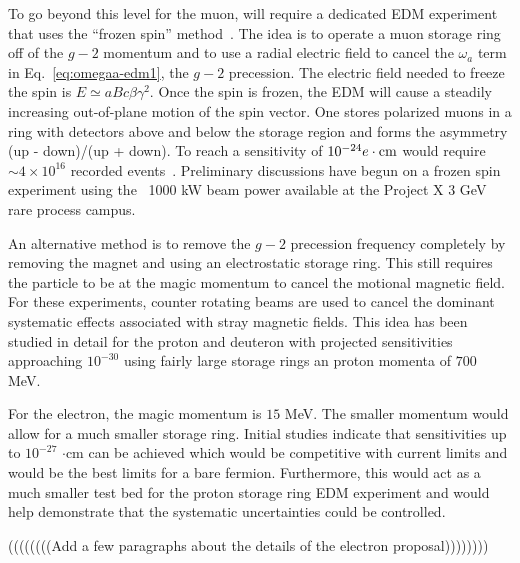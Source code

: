 To go beyond this level for the muon, will require a dedicated EDM experiment that
uses
the ``frozen spin'' method~\cite{Farley04,Roberts2010}.
 The idea is to operate a
muon storage ring off of the  $g-2$ momentum and to use a radial electric field
to cancel the $\omega_a$ term in Eq.~\ref{eq:omegaa-edm1},
 the $g-2$ precession.  The  electric field needed to freeze the spin is
$E \simeq aBc\beta\gamma^2$.
Once the spin is frozen, the EDM will cause a steadily increasing
out-of-plane motion of the spin vector. One stores polarized muons in a ring
with detectors above and below the storage region and forms the asymmetry
(up - down)/(up + down).  To reach a sensitivity of $10^{-24}e \cdot {\rm cm}$ would
require $\sim 4 \times 10^{16}$ recorded events~\cite{Farley04}.
 Preliminary discussions have begun on a frozen spin experiment
using the ~1000 kW beam power available at the Project X 3 GeV rare process campus.

An alternative method is to remove the $g-2$ precession frequency completely by removing 
the magnet and using an electrostatic storage ring. This still requires the particle to be at the 
magic momentum to cancel the motional magnetic field.  For these experiments, counter rotating 
beams are used to cancel the dominant systematic effects associated with stray magnetic fields.  
This idea has been studied in detail for the proton and deuteron with projected sensitivities approaching $10^{-30}$ 
using fairly large storage rings an proton momenta of $700$ MeV.

For the electron, the magic momentum is $15$ MeV.  The smaller momentum would allow for a
 much smaller storage ring.  Initial studies indicate that sensitivities up to $10^{-27}$ $\cdot $cm 
 can be achieved which would be competitive with current limits and would be the best limits for a
  bare fermion.  Furthermore, this would act as a much smaller test bed for the proton storage ring EDM experiment and would 
  help demonstrate that the systematic uncertainties could be controlled.
  
((((((((Add a few paragraphs about the details of the electron proposal))))))))


